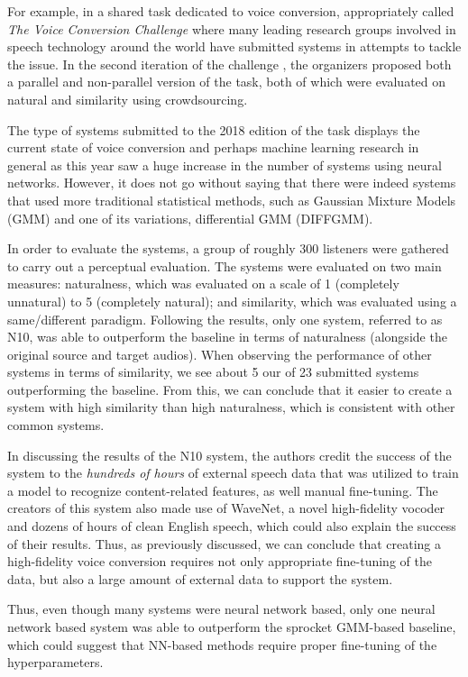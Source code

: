\documentclass
[
    a4paper,
    twoside,
    12pt,
]
{report}
\begin{document}
For example, in a shared task dedicated to voice conversion,
appropriately called \emph{The Voice Conversion Challenge} where many
leading research groups involved in speech technology around the world
have submitted systems in attempts to tackle the issue. In the second
iteration of the challenge \textcite{lorenzo-trueba2018}, the organizers
proposed both a parallel and non-parallel version of the task, both of
which were evaluated on natural and similarity using crowdsourcing.

The type of systems submitted to the 2018 edition of the task displays
the current state of voice conversion and perhaps machine learning
research in general as this year saw a huge increase in the number of
systems using neural networks. However, it does not go without saying
that there were indeed systems that used more traditional statistical
methods, such as Gaussian Mixture Models (GMM) and one of its
variations, differential GMM (DIFFGMM).

In order to evaluate the systems, a group of roughly 300 listeners were
gathered to carry out a perceptual evaluation. The systems were
evaluated on two main measures: naturalness, which was evaluated on a
scale of 1 (completely unnatural) to 5 (completely natural); and
similarity, which was evaluated using a same/different paradigm.
Following the results, only one system, referred to as N10, was able to
outperform the baseline in terms of naturalness (alongside the original
source and target audios). When observing the performance of other
systems in terms of similarity, we see about 5 our of 23 submitted
systems outperforming the baseline. From this, we can conclude that it
easier to create a system with high similarity than high naturalness,
which is consistent with other common systems.

In discussing the results of the N10 system, the authors credit the
success of the system to the \emph{hundreds of hours} of external speech
data that was utilized to train a model to recognize content-related
features, as well manual fine-tuning. The creators of this system also
made use of WaveNet, a novel high-fidelity vocoder and dozens of hours
of clean English speech, which could also explain the success of their
results. Thus, as previously discussed, we can conclude that creating a
high-fidelity voice conversion requires not only appropriate fine-tuning
of the data, but also a large amount of external data to support the
system.

Thus, even though many systems were neural network based, only one
neural network based system was able to outperform the sprocket
GMM-based baseline, which could suggest that NN-based methods require
proper fine-tuning of the hyperparameters.
\end{document}
